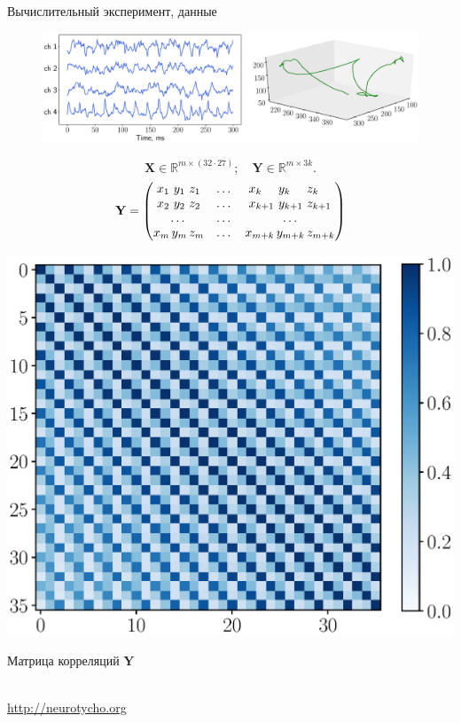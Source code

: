 \documentclass[9pt]{beamer}
\newcommand{\bY}{\mathbf{Y}}
\newcommand{\bX}{\mathbf{X}}
\newcommand{\bbR}{\mathbb{R}}
\begin{document}
\begin{frame}{Вычислительный эксперимент, данные}
\begin{figure}
	\includegraphics[width=\linewidth]{figs/ecog_data}
\end{figure}
\begin{minipage}{.55\linewidth}
\[
	\bX \in \bbR^{m \times (32 \cdot 27)}; \quad
	\bY \in \bbR^{m \times 3k}.
\]
\vspace{0.1cm}
\[
	\bY = 
	\begin{pmatrix}
	x_1 \,\, y_1 \,\, z_1 & \dots & x_{k\hphantom{+1}} \,\, y_{k\hphantom{+1}} \,\, z_{k\hphantom{+1}}\\
	x_2 \,\, y_2 \,\, z_2 & \dots & x_{k + 1} \,\, y_{k + 1} \,\, z_{k + 1}\\
	 \dots & \dots & \dots  \\
	x_m \, y_m \, z_m & \dots & x_{m + k} \, y_{m + k} \, z_{m + k}
	\end{pmatrix}
\]
\end{minipage}%
\begin{minipage}{.43\linewidth}
	\includegraphics[width=\linewidth]{figs/Y_corr_matrix.eps}
	\begin{center}
		\vspace{-0.4cm}
		Матрица корреляций $\bY$
		\vspace{-0.4cm}
	\end{center}
\end{minipage}
\vspace{0.5cm}

\hrulefill \\
\url{http://neurotycho.org}
\end{frame}
\end{document}
